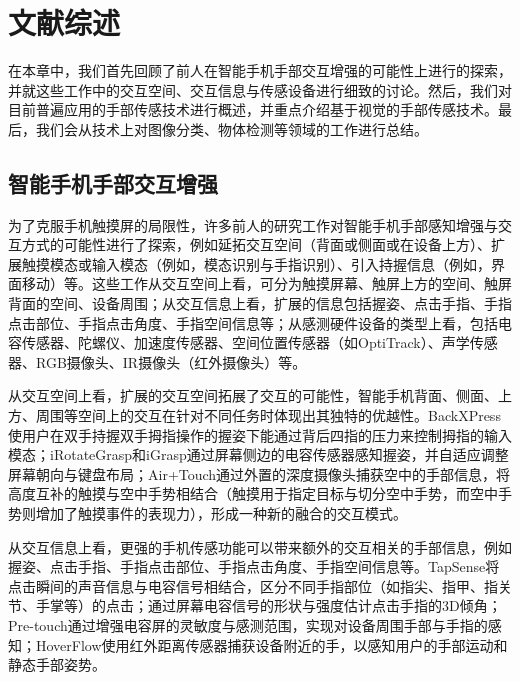 \chapter{文献综述}
\label{cha:related_work}

在本章中，我们首先回顾了前人在智能手机手部交互增强的可能性上进行的探索，并就这些工作中的交互空间、交互信息与传感设备进行细致的讨论。然后，我们对目前普遍应用的手部传感技术进行概述，并重点介绍基于视觉的手部传感技术。最后，我们会从技术上对图像分类、物体检测等领域的工作进行总结。

\section{智能手机手部交互增强}

为了克服手机触摸屏的局限性，许多前人的研究工作对智能手机手部感知增强与交互方式的可能性进行了探索，例如延拓交互空间（背面\cite{Corsten:2017:BUB:3025453.3025565}\cite{Wong:2016:BBO:2999508.2999522}或侧面\cite{Chang2006Recognition}\cite{Cheng:2013:IAS:2470654.2481424}\cite{Cheng:2013:IGA:2468356.2479514}或在设备\cite{Chen:2014:AIT:2642918.2647392}\cite{Hasan:2016:TST:2983310.2985755}\cite{Hinckley:2016:PSM:2858036.2858095}上方）、扩展触摸模态或输入模态（例如，模态识别\cite{Harrison:2011:TEF:2047196.2047279}\cite{Xiao:2015:EFA:2817721.2817737}与手指识别\cite{Masson:2017:WIF:3126594.3126619}）、引入持握信息（例如，界面移动\cite{Cheng:2013:IAS:2470654.2481424}\cite{Lim:2016:WAR:2957265.2961857}）等。这些工作从交互空间上看，可分为触摸屏幕、触屏上方的空间、触屏背面的空间、设备周围；从交互信息上看，扩展的信息包括握姿、点击手指、手指点击部位、手指点击角度、手指空间信息等；从感测硬件设备的类型上看，包括电容传感器、陀螺仪、加速度传感器、空间位置传感器（如OptiTrack）、声学传感器、RGB摄像头、IR摄像头（红外摄像头）等。

从交互空间上看，扩展的交互空间拓展了交互的可能性，智能手机背面、侧面、上方、周围等空间上的交互在针对不同任务时体现出其独特的优越性。BackXPress\cite{Corsten:2017:BUB:3025453.3025565}使用户在双手持握双手拇指操作的握姿下能通过背后四指的压力来控制拇指的输入模态；iRotateGrasp\cite{Cheng:2013:IAS:2470654.2481424}和iGrasp\cite{Cheng:2013:IGA:2468356.2479514}通过屏幕侧边的电容传感器感知握姿，并自适应调整屏幕朝向与键盘布局；Air+Touch\cite{Chen:2014:AIT:2642918.2647392}通过外置的深度摄像头捕获空中的手部信息，将高度互补的触摸与空中手势相结合（触摸用于指定目标与切分空中手势，而空中手势则增加了触摸事件的表现力），形成一种新的融合的交互模式。

从交互信息上看，更强的手机传感功能可以带来额外的交互相关的手部信息，例如握姿、点击手指、手指点击部位、手指点击角度、手指空间信息等。TapSense\cite{Harrison:2011:TEF:2047196.2047279}将点击瞬间的声音信息与电容信号相结合，区分不同手指部位（如指尖、指甲、指关节、手掌等）的点击；通过屏幕电容信号的形状与强度估计点击手指的3D倾角；Pre-touch\cite{Hinckley:2016:PSM:2858036.2858095}通过增强电容屏的灵敏度与感测范围，实现对设备周围手部与手指的感知；HoverFlow\cite{Kratz:2009:HED:1613858.1613864}使用红外距离传感器捕获设备附近的手，以感知用户的手部运动和静态手部姿势。

